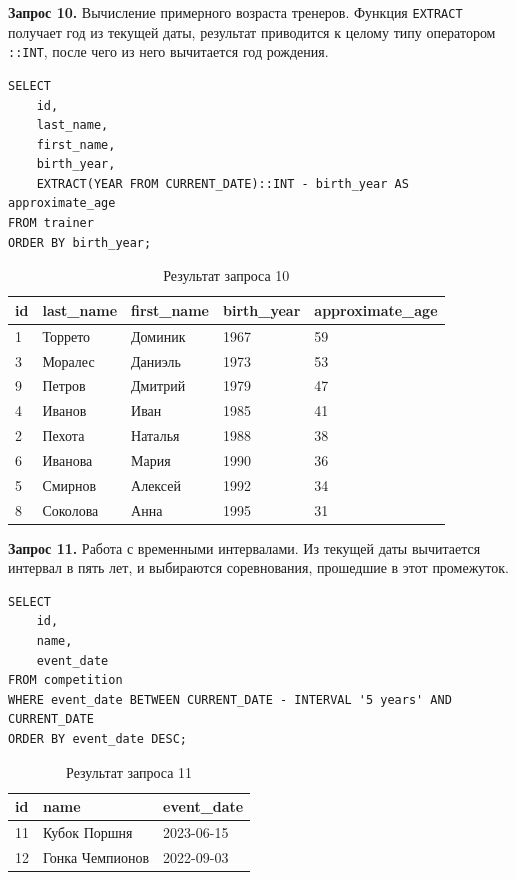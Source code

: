 \documentclass[oneside,a4paper,14pt]{extarticle}
\begin{document}
\textbf{Запрос 10.} Вычисление примерного возраста тренеров. Функция \texttt{EXTRACT} получает год из текущей даты, результат приводится к целому типу оператором \texttt{::INT}, после чего из него вычитается год рождения.

\begin{verbatim}
SELECT
    id,
    last_name,
    first_name,
    birth_year,
    EXTRACT(YEAR FROM CURRENT_DATE)::INT - birth_year AS approximate_age
FROM trainer
ORDER BY birth_year;
\end{verbatim}

\begin{table}[H]
\centering
\footnotesize

\caption{Результат запроса 10}\label{tab:infun5}
\begin{tabular}{|l|l|l|l|l|}
\hline
\textbf{id} & \textbf{last\_\allowbreak name} & \textbf{first\_\allowbreak name} & \textbf{birth\_\allowbreak year} & \textbf{approximate\_\allowbreak age} \\ \hline
1 & Торрето & Доминик & 1967 & 59 \\ \hline
3 & Моралес & Даниэль & 1973 & 53 \\ \hline
9 & Петров & Дмитрий & 1979 & 47 \\ \hline
4 & Иванов & Иван & 1985 & 41 \\ \hline
2 & Пехота & Наталья & 1988 & 38 \\ \hline
6 & Иванова & Мария & 1990 & 36 \\ \hline
5 & Смирнов & Алексей & 1992 & 34 \\ \hline
8 & Соколова & Анна & 1995 & 31 \\ \hline
\end{tabular}
\end{table}


\textbf{Запрос 11.} Работа с временными интервалами. Из текущей даты вычитается интервал в пять лет, и выбираются соревнования, прошедшие в этот промежуток.

\begin{verbatim}
SELECT
    id,
    name,
    event_date
FROM competition
WHERE event_date BETWEEN CURRENT_DATE - INTERVAL '5 years' AND CURRENT_DATE
ORDER BY event_date DESC;
\end{verbatim}

\begin{table}[H]
\centering
\footnotesize

\caption{Результат запроса 11}\label{tab:infun6}
\begin{tabular}{|l|l|l|}
\hline
\textbf{id} & \textbf{name} & \textbf{event\_\allowbreak date} \\ \hline
11 & Кубок Поршня & 2023-06-15 \\ \hline
12 & Гонка Чемпионов & 2022-09-03 \\ \hline
\end{tabular}
\end{table}
\end{document}
